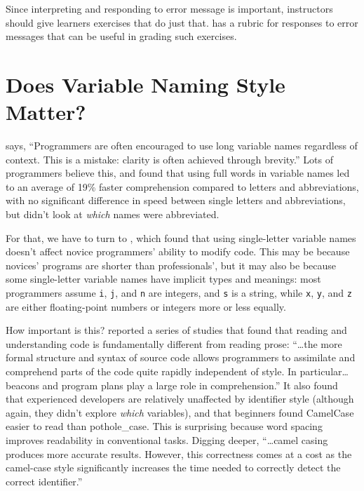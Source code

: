 Since interpreting and responding to error message is important,
instructors should give learners exercises that do just that.
\cite{Marc2011} has a rubric for responses to error messages that can
be useful in grading such exercises.

\section{Does Variable Naming Style Matter?}\label{s:pck-code}

\cite{Kern1999} says, ``Programmers are often encouraged to use long
variable names regardless of context. This is a mistake: clarity is
often achieved through brevity.''  Lots of programmers believe this,
and \cite{Hofm2017} found that using full words in variable names led
to an average of 19\% faster comprehension compared to letters and
abbreviations, with no significant difference in speed between single
letters and abbreviations, but didn't look at \emph{which} names were
abbreviated.

For that, we have to turn to \cite{Beni2017}, which found that using
single-letter variable names doesn't affect novice programmers'
ability to modify code.  This may be because novices' programs are
shorter than professionals', but it may also be because some
single-letter variable names have implicit types and meanings: most
programmers assume \texttt{i}, \texttt{j}, and \texttt{n} are
integers, and \texttt{s} is a string, while \texttt{x}, \texttt{y},
and \texttt{z} are either floating-point numbers or integers more or
less equally.

How important is this?  \cite{Bink2012} reported a series of studies
that found that reading and understanding code is fundamentally
different from reading prose: ``{\ldots}the more formal structure and
syntax of source code allows programmers to assimilate and comprehend
parts of the code quite rapidly independent of style.  In
particular{\ldots}beacons and program plans play a large role in
comprehension.''  It also found that experienced developers are
relatively unaffected by identifier style (although again, they didn't
explore \emph{which} variables), and that beginners found CamelCase
easier to read than pothole\_case.  This is surprising because word
spacing improves readability in conventional tasks.  Digging deeper,
``{\ldots}camel casing produces more accurate results.  However, this
correctness comes at a cost as the camel-case style significantly
increases the time needed to correctly detect the correct
identifier.''

